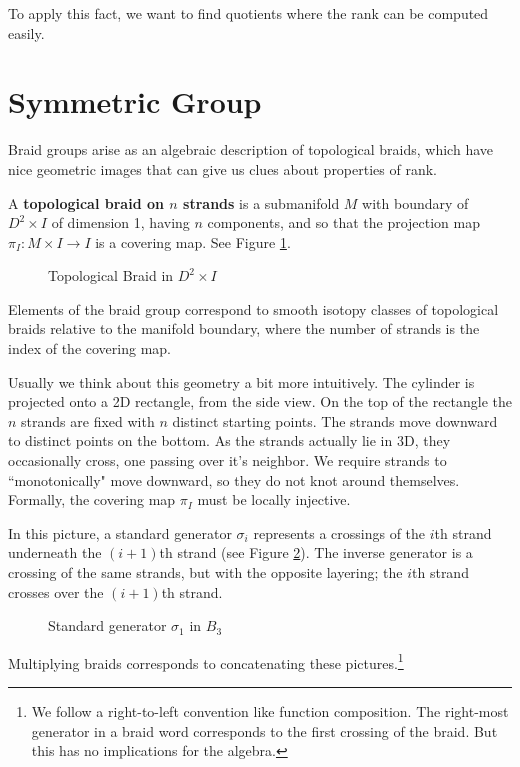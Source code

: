 \documentclass[12pt]{thesis}
\begin{document}
To apply this fact, we want to find quotients
where the rank can be computed easily.

\section{Symmetric Group}

\label{chap:symmetric-group}

Braid groups arise as an algebraic description of topological braids,
which have nice geometric images that can give us clues about properties of rank.
\begin{definition}
    A \textbf{topological braid on $n$ strands} is a submanifold $M$ with boundary of $D^{2} \times I$ of dimension 1, having $n$ components,
    and so that the projection map $\pi_{I} \colon M \times I \rightarrow I$
    is a covering map. See Figure \ref{fig:topological-braid}.
\end{definition}

\begin{figure}[h]
    \centering
    \def\svgwidth{10cm}
    
    \caption{Topological Braid in $D^{2} \times I$}
    \label{fig:topological-braid}
\end{figure}

Elements of the braid group correspond to smooth isotopy classes of topological braids
relative to the manifold boundary,
where the number of strands is the index of the covering map.

Usually we think about this geometry a bit more intuitively.
The cylinder is projected onto a 2D 
rectangle, from the side view.
On the top of the rectangle
the $n$ strands are fixed with $n$ distinct starting points.
The strands move downward
to distinct points on the bottom.
As the strands actually lie in 3D,
they occasionally cross, one passing over it's neighbor.
We require strands to ``monotonically" move downward,
so they do not knot around themselves.
Formally, the covering map $\pi_{I}$ must be locally injective.

In this picture,
a standard generator $\sigma_{i}$ represents a crossings of the $i$th strand
underneath the $(i + 1)$th strand (see Figure \ref{fig:standard-generator}).
The inverse generator is a crossing of the same strands, but with the opposite layering;
the $i$th strand crosses over the $(i + 1)$th strand.
\begin{figure}[h]
    \centering
    \def\svgwidth{4cm}
    
    \caption{Standard generator $\sigma_{1}$ in $B_{3}$}
    \label{fig:standard-generator}
\end{figure}
Multiplying braids corresponds to concatenating these pictures.\footnote{We follow a right-to-left convention like function composition. The right-most generator
in a braid word corresponds to the first crossing of the braid.
But this has no implications for the algebra.}
\end{document}
